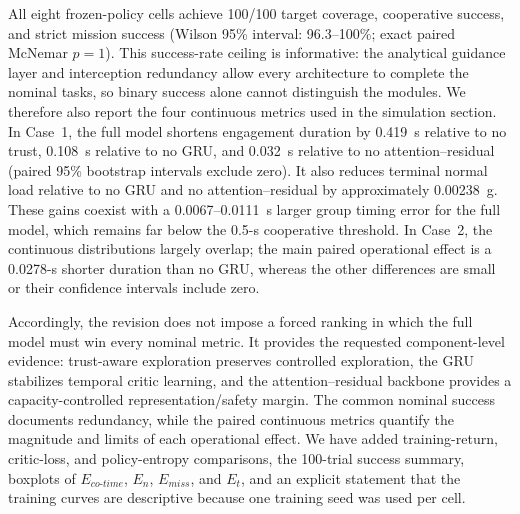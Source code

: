 All eight frozen-policy cells achieve 100/100 target coverage, cooperative success, and strict mission success (Wilson 95\% interval: 96.3--100\%; exact paired McNemar $p=1$). This success-rate ceiling is informative: the analytical guidance layer and interception redundancy allow every architecture to complete the nominal tasks, so binary success alone cannot distinguish the modules. We therefore also report the four continuous metrics used in the simulation section. In Case~1, the full model shortens engagement duration by 0.419~s relative to no trust, 0.108~s relative to no GRU, and 0.032~s relative to no attention--residual (paired 95\% bootstrap intervals exclude zero). It also reduces terminal normal load relative to no GRU and no attention--residual by approximately 0.00238~g. These gains coexist with a 0.0067--0.0111~s larger group timing error for the full model, which remains far below the 0.5-s cooperative threshold. In Case~2, the continuous distributions largely overlap; the main paired operational effect is a 0.0278-s shorter duration than no GRU, whereas the other differences are small or their confidence intervals include zero.

Accordingly, the revision does not impose a forced ranking in which the full model must win every nominal metric. It provides the requested component-level evidence: trust-aware exploration preserves controlled exploration, the GRU stabilizes temporal critic learning, and the attention--residual backbone provides a capacity-controlled representation/safety margin. The common nominal success documents redundancy, while the paired continuous metrics quantify the magnitude and limits of each operational effect. We have added training-return, critic-loss, and policy-entropy comparisons, the 100-trial success summary, boxplots of $E_{co\text{-}time}$, $E_n$, $E_{miss}$, and $E_t$, and an explicit statement that the training curves are descriptive because one training seed was used per cell.
